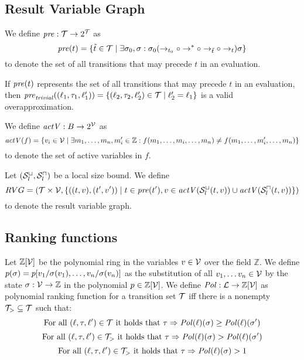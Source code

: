 \subsection{Result Variable Graph}

\begin{definition} 
  We define $\mathit{pre}: \mathcal{T} \rightarrow 2^{\mathcal{T}}$ as
  \[\mathit{pre}(t) = \lbrace \tilde{t} \in \mathcal{T} \mid \exists \sigma_0, \sigma: \sigma_0 (\rightarrow_{t_0} \circ \rightarrow^* \circ \rightarrow_{\tilde{t}} \circ \rightarrow_{t}) \sigma \rbrace\]
  to denote the set of all transitions that may precede $t$ in an evaluation.	
\end{definition}

If $\mathit{pre}(t)$ represents the set of all transitions that may precede $t$ in an evaluation, then $\mathit{pre}_{\mathit{trivial}}((\ell_1, \tau_1, \ell_1')) = \lbrace (\ell_2, \tau_2, \ell_2') \in \mathcal{T} \mid \ell_2' = \ell_1 \rbrace$ is a valid overapproximation.

\begin{definition} 
	We define $\mathit{actV}: B \rightarrow 2^{\mathcal{V}}$ as 
	\[ \mathit{actV}(f) = \lbrace  v_i \in \mathcal{V} \mid \exists m_1, \dots, m_n, m_i' \in \mathbb{Z}: f(m_1, \dots, m_i, \dots, m_n) \neq f(m_1, \dots, m_i', \dots, m_n) \rbrace \]
	to denote the set of active variables in $f$.
\end{definition}

\begin{definition}
	Let ${({\mathcal{S}^\sqcup_l}, {\mathcal{S}^\sqcap_l})}$ be a local size bound.
	We define 
	\[ RVG = (\mathcal{T} \times \mathcal{V}, \lbrace ((t, v), (t', v')) \mid t \in \mathit{pre}(t'), v \in \mathit{actV}({\mathcal{S}^\sqcup_l}(t,v)) \cup \mathit{actV}({\mathcal{S}^\sqcap_l}(t,v)) \rbrace) \]
	to denote the result variable graph.
\end{definition}


\subsection{Ranking functions}

\begin{definition} 
	Let $\mathbb{Z}[\mathcal{V}]$ be the polynomial ring in the variables $v \in \mathcal{V}$ over the field $\mathbb{Z}$.
	We define $p(\sigma) = p[v_1/\sigma(v_1), \dots, v_n/\sigma(v_n)]$ as the substitution of all $v_1, \dots v_n \in \mathcal{V}$ by the state $\sigma: \mathcal{V} \rightarrow \mathbb{Z}$ in the polynomial $p \in \mathbb{Z}[\mathcal{V}]$.
	We define $\mathit{Pol}: \mathcal{L} \rightarrow \mathbb{Z}[\mathcal{V}]$ as polynomial ranking function for a transition set $\mathcal{T}$ iff there is a nonempty $\mathcal{T}_{>} \subseteq \mathcal{T}$ such that:
	\[ \text{For all } (\ell, \tau, \ell') \in \mathcal{T} \text{ it holds that } \tau \Rightarrow \mathit{Pol}(\ell)(\sigma) \geq \mathit{Pol}(\ell)(\sigma') \]
	\[ \text{For all } (\ell, \tau, \ell') \in \mathcal{T}_{>} \text{ it holds that } \tau \Rightarrow \mathit{Pol}(\ell)(\sigma) > \mathit{Pol}(\ell)(\sigma') \]
	\[ \text{For all } (\ell, \tau, \ell') \in \mathcal{T}_{>} \text{ it holds that } \tau \Rightarrow \mathit{Pol}(\ell)(\sigma) > 1 \]
\end{definition}


